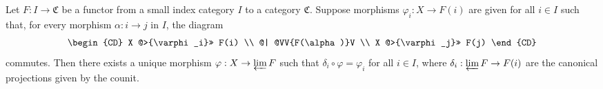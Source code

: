 Let $F : I \rightarrow \mathfrak{C}$ be a functor from a small index category $I$ to a category $\mathfrak{C}$. Suppose morphisms $\varphi_i : X \rightarrow F(i)$ are given for all $i \in I$ such that, for every morphism $\alpha : i \rightarrow j$ in $I$, the diagram
$$
\begin{CD}
X @>{\varphi_i}>> F(i) \\
@| @VV{F(\alpha)}V \\
X @>{\varphi_j}>> F(j)
\end{CD}
$$
commutes. Then there exists a unique morphism $\varphi : X \rightarrow \varprojlim F$ such that $\delta_i \circ \varphi = \varphi_i$ for all $i \in I$, where $\delta_i : \varprojlim F \rightarrow F(i)$ are the canonical projections given by the counit.